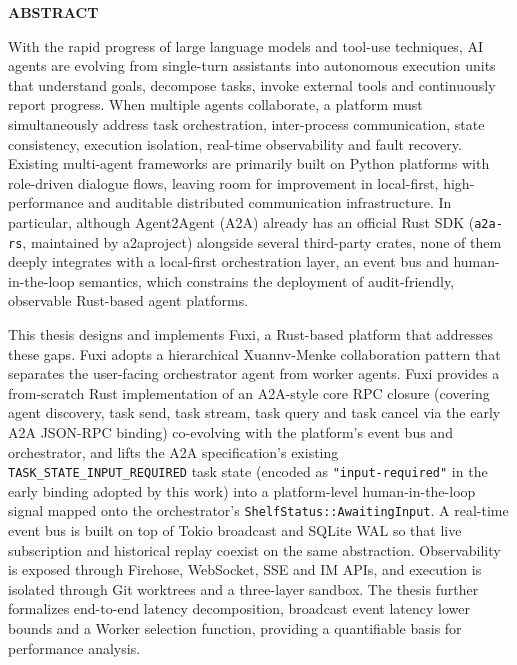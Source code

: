 \thispagestyle{empty}
\begin{center}
  {\sffamily{}\bfseries ABSTRACT}
\end{center}

\vspace{1em}

With the rapid progress of large language models and tool-use techniques, AI agents are evolving from single-turn assistants into autonomous execution units that understand goals, decompose tasks, invoke external tools and continuously report progress. When multiple agents collaborate, a platform must simultaneously address task orchestration, inter-process communication, state consistency, execution isolation, real-time observability and fault recovery. Existing multi-agent frameworks are primarily built on Python platforms with role-driven dialogue flows, leaving room for improvement in local-first, high-performance and auditable distributed communication infrastructure. In particular, although Agent2Agent (A2A) already has an official Rust SDK (\texttt{a2a-rs}, maintained by a2aproject) alongside several third-party crates, none of them deeply integrates with a local-first orchestration layer, an event bus and human-in-the-loop semantics, which constrains the deployment of audit-friendly, observable Rust-based agent platforms.

This thesis designs and implements Fuxi, a Rust-based platform that addresses these gaps. Fuxi adopts a hierarchical Xuannv-Menke collaboration pattern that separates the user-facing orchestrator agent from worker agents. Fuxi provides a from-scratch Rust implementation of an A2A-style core RPC closure (covering agent discovery, task send, task stream, task query and task cancel via the early A2A JSON-RPC binding) co-evolving with the platform's event bus and orchestrator, and lifts the A2A specification's existing \texttt{TASK\_STATE\_INPUT\_REQUIRED} task state (encoded as \texttt{"input-required"} in the early binding adopted by this work) into a platform-level human-in-the-loop signal mapped onto the orchestrator's \texttt{ShelfStatus::AwaitingInput}. A real-time event bus is built on top of Tokio broadcast and SQLite WAL so that live subscription and historical replay coexist on the same abstraction. Observability is exposed through Firehose, WebSocket, SSE and IM APIs, and execution is isolated through Git worktrees and a three-layer sandbox. The thesis further formalizes end-to-end latency decomposition, broadcast event latency lower bounds and a Worker selection function, providing a quantifiable basis for performance analysis.

